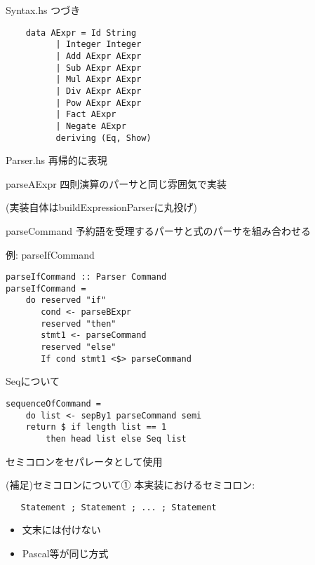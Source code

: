 \documentclass[uplatex,dvipdfmx,ja=standard]{beamer}
\begin{document}
\begin{frame}[fragile]{Syntax.hs}
    つづき
    \begin{verbatim}
    data AExpr = Id String 
          | Integer Integer
          | Add AExpr AExpr
          | Sub AExpr AExpr
          | Mul AExpr AExpr
          | Div AExpr AExpr
          | Pow AExpr AExpr
          | Fact AExpr
          | Negate AExpr
          deriving (Eq, Show)
    \end{verbatim}
\end{frame}

\begin{frame}[fragile]{Parser.hs}
    再帰的に表現

\end{frame}

\begin{frame}[fragile]{parseAExpr}
    四則演算のパーサと同じ雰囲気で実装

    (実装自体はbuildExpressionParserに丸投げ)
\end{frame}

\begin{frame}[fragile]{parseCommand}
    予約語を受理するパーサと式のパーサを組み合わせる

    例: parseIfCommand
    \begin{verbatim}
parseIfCommand :: Parser Command
parseIfCommand =
    do reserved "if"
       cond <- parseBExpr 
       reserved "then"
       stmt1 <- parseCommand
       reserved "else"
       If cond stmt1 <$> parseCommand
   \end{verbatim}
\end{frame}

\begin{frame}[fragile]{Seqについて}
    \begin{verbatim}
sequenceOfCommand =
    do list <- sepBy1 parseCommand semi
    return $ if length list == 1 
        then head list else Seq list
   \end{verbatim}

セミコロンをセパレータとして使用

\end{frame}

\begin{frame}[fragile]{(補足)セミコロンについて①}
    本実装におけるセミコロン:
   \begin{verbatim}
   Statement ; Statement ; ... ; Statement
   \end{verbatim}
   \begin{itemize}
       \item 文末には付けない
       \item Pascal等が同じ方式
   \end{itemize}
\end{frame}
\end{document}
